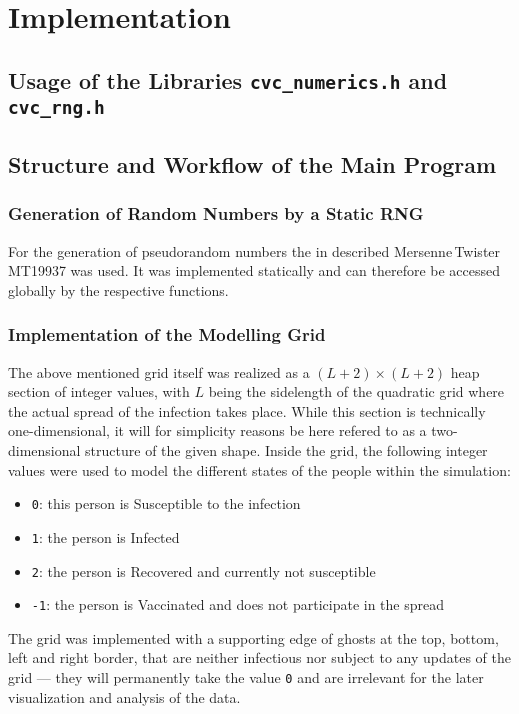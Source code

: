 \section{Implementation}

\subsection{Usage of the Libraries \texttt{cvc\_numerics.h} and \texttt{cvc\_rng.h}}

\subsection{Structure and Workflow of the Main Program}

\subsubsection*{Generation of Random Numbers by a Static RNG}

For the generation of pseudorandom numbers the in  described Mersenne\,Twister MT19937 was used. It was implemented statically and can therefore be accessed
globally by the respective functions.



\subsubsection*{Implementation of the Modelling Grid}

The above mentioned grid itself was realized as a $\left(L+2\right)\times \left(L+2\right)$ heap section of integer values, with $L$ being the sidelength of the quadratic grid where the actual spread of the infection takes place.
While this section is technically one-dimensional, it will for simplicity reasons be here refered to as a two-dimensional structure of the given shape. Inside the grid, the following integer values were used 
to model the different states of the people within the simulation:
\begin{itemize}
    \item \texttt{0}: this person is Susceptible \susceptible{} to the infection
    \item \texttt{1}: the person is Infected \infected{}
    \item \texttt{2}: the person is Recovered \recovered{} and currently not susceptible
    \item \texttt{-1}: the person is Vaccinated \vaccinated{} and does not participate in the spread
\end{itemize}
The grid was implemented with a supporting edge of ghosts at the top, bottom, left and right border, that are neither infectious nor subject to any updates of the grid --- they will permanently take the value
\texttt{0} and are irrelevant for the later visualization and analysis of the data.

